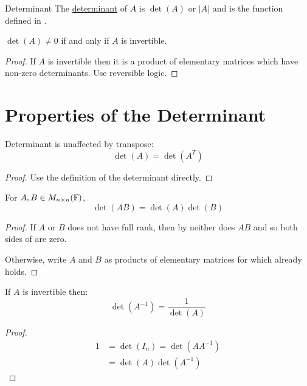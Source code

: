 \documentclass[../Main.tex]{subfiles}
\begin{document}
\begin{definition}{Determinant}
    The \underline{determinant} of $A$ is $\det(A)$ or $|A|$ and is the function defined in .
\end{definition}
\begin{corollary}
    $\det(A) \neq 0$ if and only if $A$ is invertible.
    \label{corDetInvert}
\end{corollary}
\begin{proof}
    If $A$ is invertible then it is a product of elementary matrices which have non-zero determinants. Use reversible logic.
\end{proof}
\section{Properties of the Determinant}
\begin{lemma}
    Determinant is unaffected by transpose:
    \begin{equation*}
        \det(A) = \det(A^T)
    \end{equation*}
    \label{lemDetTranspose}
\end{lemma}
\begin{proof}
    Use the definition of the determinant directly.
\end{proof}
\begin{proposition}
    For $A, B \in M_{n \times n}(\mathbb{F})$,
    \begin{equation}
        \det(AB) = \det(A) \det(B)
        \label{eqnDetProduct}
    \end{equation}
    \label{propDetProduct}
\end{proposition}
\begin{proof}
    If $A$ or $B$ does not have full rank, then by  neither does $AB$ and so both sides of  are zero.

    Otherwise, write $A$ and $B$ as products of elementary matrices for which  already holds.
\end{proof}
\begin{corollary}
    If $A$ is invertible then:
    \begin{equation*}
        \det(A^{-1}) = \frac{1}{\det(A)}
    \end{equation*}
    \label{corDetInverse}
\end{corollary}
\begin{proof}
    \begin{align*}
        1 &= \det(I_n) = \det(AA^{-1}) \\
        &= \det(A) \det(A^{-1})
    \end{align*}
\end{proof}
\end{document}
